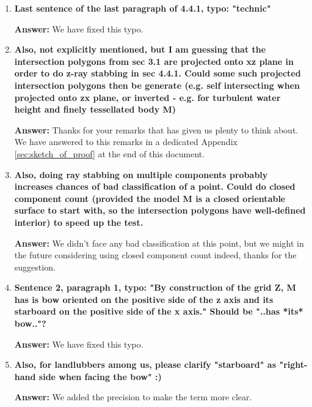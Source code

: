 \documentclass{article}
\newcommand{\answer}[1]{\textbf{\textcolor{answercolor}{Answer:}} \textcolor{answercolor}{#1}}
\begin{document}
\begin{enumerate}[label=\textbf{\arabic*.}]
	      \answer{TODO what robustness issues and instability ?}

	\item \textbf{Last sentence of the last paragraph of 4.4.1, typo: "technic"}

	      \answer{We have fixed this typo.}

	\item \textbf{Also, not explicitly mentioned, but I am guessing that the intersection polygons from sec 3.1 are projected onto xz plane in order to do z-ray stabbing in sec 4.4.1. Could some such projected intersection polygons then be generate (e.g. self intersecting when projected onto zx plane, or inverted - e.g. for turbulent water height and finely tessellated body M)}

	      \answer{Thanks for your remarks that has given us plenty to think about. We have answered to this remarks in a dedicated Appendix \ref{sec:sketch_of_proof} at the end of this document.}


	\item \textbf{Also, doing ray stabbing on multiple components probably increases chances of bad classification of a point. Could do closed component count (provided the model M is a closed orientable surface to start with, so the intersection polygons have well-defined interior) to speed up the test.}

	      \answer{We didn't face any bad classification at this point, but we might in the future considering using closed component count indeed, thanks for the suggestion.}

	\item \textbf{Sentence 2, paragraph 1, typo: "By construction of the grid Z, M has is bow oriented on the positive side of the z axis and its starboard on the positive side of the x axis." Should be "..has *its* bow.."?}

	      \answer{We have fixed this typo.}


	\item \textbf{Also, for landlubbers among us, please clarify "starboard" as "right-hand side when facing the bow" :)}

	      \answer{We added the precision to make the term more clear.}



\end{enumerate}
\end{document}
